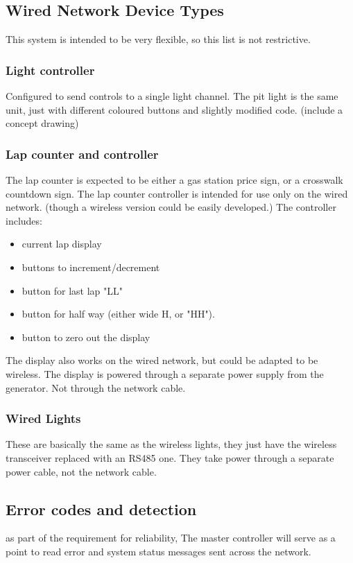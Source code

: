 \documentclass{article}
\begin{document}
     \subsection{Wired Network Device Types}
     	This system is intended to be very flexible, so this list is not restrictive.
     	\subsubsection{Light controller}
     	Configured to send controls to a single light channel.
     	The pit light is the same unit, just with different coloured buttons and slightly modified code.
     	(include a concept drawing)
     	\subsubsection{Lap counter and controller}
     	The lap counter is expected to be either a gas station price sign, or a crosswalk countdown sign.
     	The lap counter controller is intended for use only on the wired network. (though a wireless version could be easily developed.)
     	The controller includes:
     	\begin{itemize}
     		\item current lap display
     		\item buttons to increment/decrement
     		\item button for last lap "LL"
     		\item button for half way (either wide H, or "HH").
     		\item button to zero out the display
     	\end{itemize}
     	The display also works on the wired network, but could be adapted to be wireless.
     	The display is powered through a separate power supply from the generator. Not through the network cable.
     	\subsubsection{Wired Lights}
     	These are basically the same as the wireless lights, they just have the wireless transceiver replaced with an RS485 one.
     	They take power through a separate power cable, not the network cable.
     \subsection{Error codes and detection}
     as part of the requirement for reliability, The master controller will serve as a point to read error and system status messages sent across the network.
\end{document}
